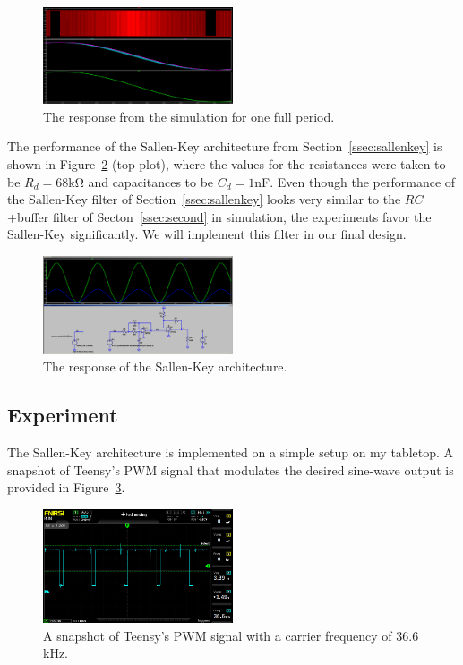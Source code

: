 \begin{figure}[t]
\includegraphics[width=0.5\textwidth]{./figures/pwm_filtered_one_two_final_signal.png}
\caption{The response from the simulation for one full period.} 
\label{fig:response}
\end{figure}


The performance of the Sallen-Key architecture from Section~\ref{ssec:sallenkey}
is shown in Figure~\ref{fig:sallenkey_sim} (top plot), where the values for the
resistances were taken to be $R_d = 68$\unit{\kilo\ohm} and capacitances to be
$C_d = 1$\unit{\nano\farad}. Even though the performance of the Sallen-Key
filter of Section~\ref{ssec:sallenkey} looks very similar to the $RC$+buffer
filter of Secton~\ref{ssec:second} in simulation, the experiments favor the
Sallen-Key significantly. We will implement this filter in our final design.

\begin{figure}[tbh]
\includegraphics[width=0.5\textwidth]{./figures/sallenkey.png}
\caption{The response of the Sallen-Key architecture.}
\label{fig:sallenkey_sim}
\end{figure}


\vspace{-1em}
\subsection{Experiment}
\vspace{-1em}

The Sallen-Key architecture is implemented on a simple setup on my tabletop.
A snapshot of Teensy's PWM signal that modulates the desired sine-wave output is
provided in Figure~\ref{fig:teensy_pwm}.


\begin{figure}[bh]
    \includegraphics[width=0.5\textwidth]{./figures/teensy_pwm_osc.jpg}
    \caption{A snapshot of Teensy's PWM signal with a carrier frequency of
    $36.6$\unit{\kilo\hertz}.}
    \label{fig:teensy_pwm}
\end{figure}

